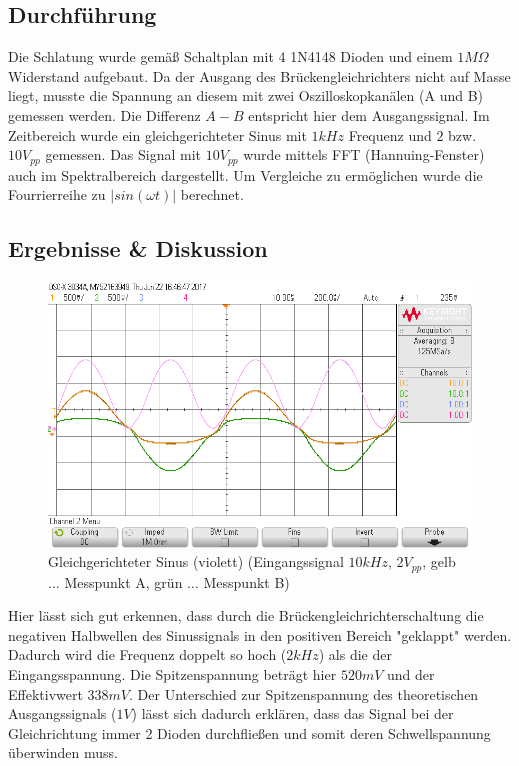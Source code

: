 \documentclass[12pt,a4paper,titlepage]{article}
\begin{document}
\subsection*{Durchf\"uhrung}
Die Schlatung wurde gemäß Schaltplan mit 4 1N4148 Dioden und einem $1M\Omega$ Widerstand aufgebaut. Da der Ausgang des Brückengleichrichters nicht auf Masse liegt, musste die Spannung an diesem mit zwei Oszilloskopkanälen (A und B) gemessen werden. Die Differenz $A - B$ entspricht hier dem Ausgangssignal. Im Zeitbereich wurde ein gleichgerichteter Sinus mit $1kHz$ Frequenz und $2$ bzw. $10V_{pp}$ gemessen. Das Signal mit $10V_{pp}$ wurde mittels FFT (Hannuing-Fenster) auch im Spektralbereich dargestellt. Um Vergleiche zu ermöglichen wurde die Fourrierreihe zu $|sin(\omega t)|$ berechnet.

\subsection*{Ergebnisse \& Diskussion}

\begin{figure}[H]
  \centering
  \includegraphics[width=150mm]{scope_52.png}
  \caption{Gleichgerichteter Sinus (violett) (Eingangssignal $10kHz$, $2V_{pp}$, gelb $\hdots$ Messpunkt A, grün $\hdots$ Messpunkt B)}
\end{figure}

\noindent Hier lässt sich gut erkennen, dass durch die Brückengleichrichterschaltung die negativen Halbwellen des Sinussignals in den positiven Bereich "geklappt" werden. Dadurch wird die Frequenz doppelt so hoch ($2kHz$) als die der Eingangsspannung. Die Spitzenspannung beträgt hier $520mV$ und der Effektivwert $338mV$. Der Unterschied zur Spitzenspannung des theoretischen Ausgangssignals ($1V$) lässt sich dadurch erklären, dass das Signal bei der Gleichrichtung immer 2 Dioden durchfließen und somit deren Schwellspannung überwinden muss.
\end{document}
